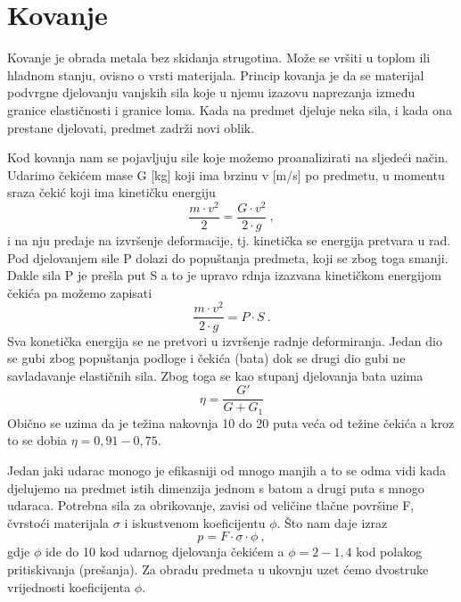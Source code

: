 \documentclass[a4paper,12pt]{article}
\numberwithin{figure}{section}
\begin{document}
\section{Kovanje}
Kovanje je obrada metala bez skidanja strugotina. Može se vršiti u toplom ili hladnom stanju, ovisno o vrsti materijala. Princip kovanja je da se materijal podvrgne djelovanju vanjskih sila koje u njemu izazovu naprezanja između granice elastičnosti i granice loma. Kada na predmet djeluje neka sila, i kada ona prestane djelovati, predmet zadrži novi oblik.\par
Kod kovanja nam se pojavljuju sile koje možemo proanalizirati na sljedeći način. Udarimo čekićem mase G [kg] koji ima brzinu v [m/s] po predmetu, u momentu sraza čekić koji ima kinetičku energiju
\begin{equation}
\frac{m\cdot v^{2}}{2} = \frac{G\cdot v^{2}}{2 \cdot g}\:,
\end{equation}
i na nju predaje na izvršenje deformacije, tj. kinetička se energija pretvara u rad. Pod  djelovanjem sile P dolazi do popuštanja predmeta, koji se zbog toga smanji. Dakle sila P je prešla put S a to je upravo rdnja izazvana kinetičkom energijom čekića pa možemo zapisati
\begin{equation}
\frac{m\cdot v^{2}}{2 \cdot g} = P\cdot S\:.
\end{equation}
Sva konetička energija se ne pretvori u izvršenje radnje deformiranja. Jedan dio se gubi zbog popuštanja podloge i čekića (bata) dok se drugi dio gubi ne savladavanje elastičnih sila. Zbog toga se kao  stupanj djelovanja bata uzima 
\begin{equation}
\eta = \frac{G'}{G + G_{1}}
\end{equation}
Obično se uzima da je težina nakovnja 10 do 20 puta veća od težine čekića a kroz to se dobia $\eta = 0,91-0,75$.\par 
Jedan jaki udarac monogo je efikasniji od mnogo manjih a to se odma vidi kada djelujemo na predmet istih dimenzija jednom s batom a drugi puta s mnogo udaraca.
Potrebna sila za obrikovanje, zavisi od veličine tlačne površine F, čvrstoći materijala $\sigma$ i iskustvenom koeficijentu $\phi$. Što nam daje izraz
\begin{equation}
p = F\cdot \sigma \cdot \phi \:,
\end{equation}
gdje $\phi$ ide do 10 kod udarnog djelovanja čekićem a $\phi = 2 - 1,4$ kod polakog pritiskivanja (prešanja). Za obradu predmeta u ukovnju uzet ćemo dvostruke vrijednosti koeficijenta $\phi$.\par 
\end{document}
